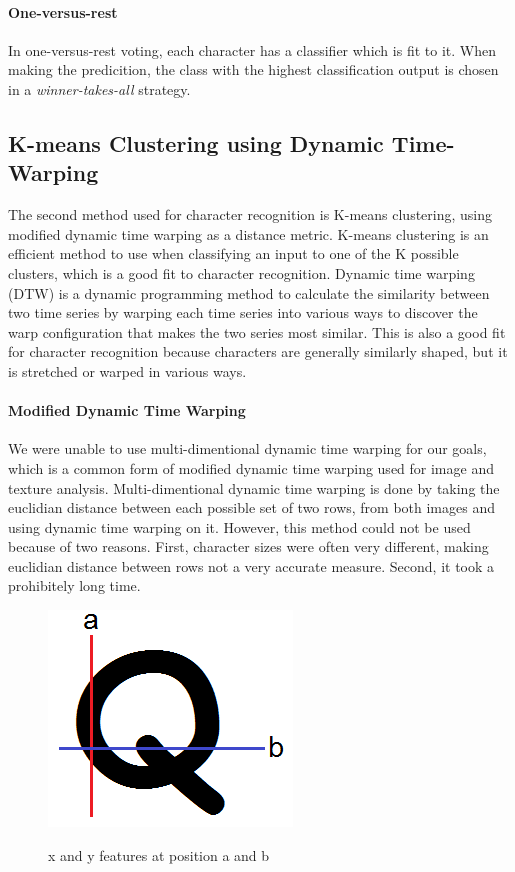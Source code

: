 \documentclass[12pt]{article}
\begin{document}
	\paragraph{One-versus-rest}
	In one-versus-rest voting, each character has a classifier which is fit to it. When making the predicition, the class with the highest classification output is chosen in a \textit{winner-takes-all} strategy.

	\subsection{K-means Clustering using Dynamic Time-Warping}
	\label{subsection:dtw}
	The second method used for character recognition is K-means clustering, using modified dynamic time warping as a distance metric. K-means clustering is an efficient method to use when classifying an input to one of the K possible clusters, which is a good fit to character recognition. Dynamic time warping (DTW) is a dynamic programming method to calculate the similarity between two time series by warping each time series into various ways to discover the warp configuration that makes the two series most similar. This is also a good fit for character recognition because characters are generally similarly shaped, but it is stretched or warped in various ways.
	
	\paragraph{Modified Dynamic Time Warping} We were unable to use multi-dimentional dynamic time warping for our goals, which is a common form of modified dynamic time warping used for image and texture analysis. Multi-dimentional dynamic time warping is done by taking the euclidian distance between each possible set of two rows, from both images and using dynamic time warping on it. However, this method could not be used because of two reasons. First, character sizes were often very different, making euclidian distance between rows not a very accurate measure. Second, it took a prohibitely long time.

	\begin{figure}[htbp!]
		\centering
		\includegraphics[scale=0.7]{xyfeatures.png}
		\label{figure:xyfeatures}
		\caption{x and y features at position a and b}
		\end{figure}
		
\end{document}
